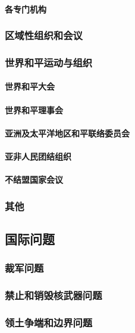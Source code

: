\documentclass[UTF8]{../RepresentationUniverse}
\begin{document}
            \paragraph{各专门机构}

        \subsubsection{区域性组织和会议}
        \subsubsection{世界和平运动与组织}
            \paragraph{世界和平大会}
            \paragraph{世界和平理事会}
            \paragraph{亚洲及太平洋地区和平联络委员会}
            \paragraph{亚非人民团结组织}
            \paragraph{不结盟国家会议}
        \subsubsection{其他}

    \subsection{国际问题}
        \subsubsection{裁军问题}
        \subsubsection{禁止和销毁核武器问题}
        \subsubsection{领土争端和边界问题}
\end{document}
